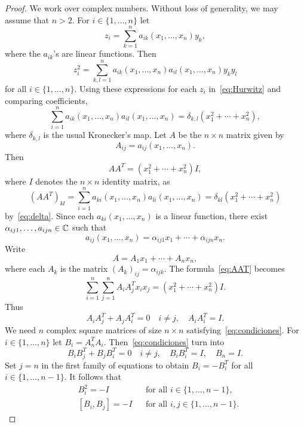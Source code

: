 \begin{proof}
    We work over complex numbers. 
	Without loss of generality, we may assume that $n>2$.  For 
	$i\in\{1,\dots,n\}$ let  
	\[
		z_i=\sum_{k=1}^n a_{ik}(x_1,\dots,x_n)y_k,
	\]
	where the $a_{ik}$'s are linear functions. Then 
	\[
		z_i^2=\sum_{k,l=1}^na_{ik}(x_1,\dots,x_n)a_{il}(x_1,\dots,x_n)y_ky_l
	\]
	for all $i\in\{1,\dots,n\}$. Using these expressions for each $z_i$
	in~\eqref{eq:Hurwitz} and comparing coefficients, 
	\begin{equation}
		\label{eq:delta}
		\sum_{i=1}^n a_{ik}(x_1,\dots,x_n)a_{il}(x_1,\dots,x_n)=\delta_{k,l}(x_1^2+\cdots+x_n^2),
	\end{equation}
	where $\delta_{k,l}$ is the usual Kronecker's map. Let 
	$A$ be the $n\times n$ matrix given by 
	\[
	A_{ij}=a_{ij}(x_1,\dots,x_n).
	\]
	Then 
	\begin{equation}
		\label{eq:AAT}
		AA^T=(x_1^2+\cdots+x_n^2)I,
	\end{equation}
	where $I$ denotes the $n\times n$ identity matrix, 
	as 
	\[
		(AA^T)_{kl}=\sum_{i=1}^na_{ki}(x_1,\dots,x_n)a_{li}(x_1,\dots,x_n)=\delta_{kl}(x_1^2+\cdots+x_n^2)
	\]
	by~\eqref{eq:delta}. Since each $a_{ki}(x_1,\dots,x_n)$ is a linear function, 
	there exist $\alpha_{ij1},\dots,a_{ijn}\in\mathbb{C}$ such that 
	\[
		a_{ij}(x_1,\dots,x_n)=\alpha_{ij1}x_1+\cdots+\alpha_{ijn}x_n.
	\]
	Write 
	\[
		A=A_1x_1+\cdots+A_nx_n,
	\]
	where each $A_k$ is the matrix $(A_k)_{ij}=\alpha_{ijk}$. 
	The formula~\eqref{eq:AAT} becomes
	\[
		\sum_{i=1}^n\sum_{j=1}^nA_iA_j^Tx_ix_j=(x_1^2+\cdots+x_n^2)I.
	\]
	Thus 
	\begin{equation}
		\label{eq:condiciones}
		A_iA_j^T+A_jA_i^T=0\quad i\ne j,\quad
		A_iA_i^T=I.
	\end{equation}
	We need $n$ complex square matrices of size $n\times n$
	satisfying~\eqref{eq:condiciones}. For $i\in\{1,\dots,n\}$ let  
	$B_i=A_n^TA_i$. Then~\eqref{eq:condiciones} turn into  
	\[
		B_iB_j^T+B_jB_i^T=0\quad i\ne j,\quad
		B_iB_i^T=I,\quad
		B_n=I.
	\]
	Set $j=n$ in the first family of equations to obtain $B_i=-B_i^T$ for all 
	$i\in\{1,\dots,n-1\}$. It follows that 
	\begin{equation}
	\label{eq:representation}
	\begin{aligned}
	    &B_i^2=-I && \text{for all $i\in\{1,\dots,n-1\}$},\\
	    &[B_i,B_j]=-I && \text{for all $i,j\in\{1,\dots,n-1\}$.}
	\end{aligned}
	\end{equation}
    

\end{proof}
